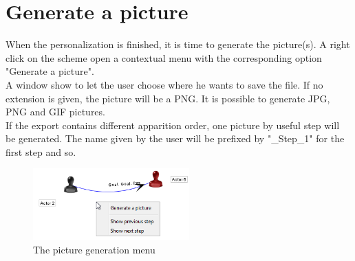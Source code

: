 \section{Generate a picture}
When the personalization is finished, it is time to generate the picture(s). A right click on the scheme open a contextual menu with the corresponding option "Generate a picture".\\

A window show to let the user choose where he wants to save the file. If no extension is given, the picture will be a PNG. It is possible to generate JPG, PNG and GIF pictures.\\

If the export contains different apparition order, one picture by useful step will be generated. The name given by the user will be prefixed by "\_Step\_1" for the first step and so.\\

\begin{figure}[h!]
\centering
\includegraphics[width=6cm]{images/generer_image.png}

\caption{The picture generation menu}

\end{figure}

  

